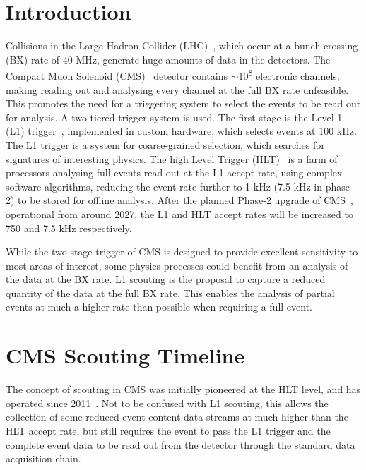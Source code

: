 \documentclass[10pt, paper=a4, UKenglish]{article}
\begin{document}
\normalsize 


\section{Introduction}
\label{Introduction}

Collisions in the Large Hadron Collider (LHC)~\cite{lhc}, which occur at a bunch crossing (BX) rate of 40 MHz, generate huge amounts of data in the detectors. The Compact Muon Solenoid (CMS)~\cite{tdr} detector contains $\sim$10\textsuperscript{8} electronic channels, making reading out and analysing every channel at the full BX rate unfeasible. This promotes the need for a triggering system to select the events to be read out for analysis. A two-tiered trigger system is used. The first stage is the Level-1 (L1) trigger~\cite{trigger}, implemented in custom hardware, which selects events at 100 kHz. The L1 trigger is a system for coarse-grained selection, which searches for signatures of interesting physics. The high Level Trigger (HLT)~\cite{trigger} is a farm of processors analysing full events read out at the L1-accept rate, using complex software algorithms, reducing the event rate further to 1 kHz (7.5 kHz in phase-2) to be stored for offline analysis. After the planned Phase-2 upgrade of CMS~\cite{tdr}, operational from around 2027, the L1 and HLT accept rates will be increased to 750 and 7.5 kHz respectively.

While the two-stage trigger of CMS is designed to provide excellent sensitivity to most areas of interest, some physics processes could benefit from an analysis of the data at the BX rate. L1 scouting is the proposal to capture a reduced quantity of the data at the full BX rate. This enables the analysis of partial events at much a higher rate than possible when requiring a full event.

\section{CMS Scouting Timeline}
\label{CMS Scouting Timeline}

The concept of scouting in CMS was initially pioneered at the HLT level, and has operated since 2011~\cite{dustin}. Not to be confused with L1 scouting, this allows the collection of some reduced-event-content data streams at much higher than the HLT accept rate, but still requires the event to pass the L1 trigger and the complete event data to be read out from the detector through the standard data acquisition chain. 
\end{document}
